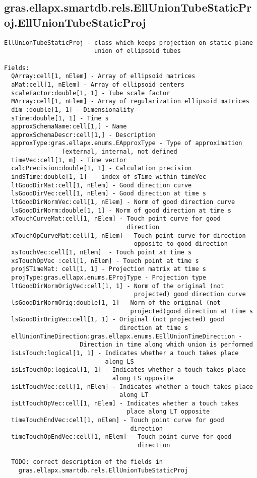 \subsection{\texorpdfstring{gras.ellapx.smartdb.rels.EllUnionTubeStaticProj.EllUnionTubeStaticProj}{EllUnionTubeStaticProj}}\label{method:gras.ellapx.smartdb.rels.EllUnionTubeStaticProj.EllUnionTubeStaticProj}
\begin{verbatim}
EllUnionTubeStaticProj - class which keeps projection on static plane
                         union of ellipsoid tubes

Fields:
  QArray:cell[1, nElem] - Array of ellipsoid matrices
  aMat:cell[1, nElem] - Array of ellipsoid centers
  scaleFactor:double[1, 1] - Tube scale factor
  MArray:cell[1, nElem] - Array of regularization ellipsoid matrices
  dim :double[1, 1] - Dimensionality
  sTime:double[1, 1] - Time s
  approxSchemaName:cell[1,] - Name
  approxSchemaDescr:cell[1,] - Description
  approxType:gras.ellapx.enums.EApproxType - Type of approximation
                (external, internal, not defined
  timeVec:cell[1, m] - Time vector
  calcPrecision:double[1, 1] - Calculation precision
  indSTime:double[1, 1]  - index of sTime within timeVec
  ltGoodDirMat:cell[1, nElem] - Good direction curve
  lsGoodDirVec:cell[1, nElem] - Good direction at time s
  ltGoodDirNormVec:cell[1, nElem] - Norm of good direction curve
  lsGoodDirNorm:double[1, 1] - Norm of good direction at time s
  xTouchCurveMat:cell[1, nElem] - Touch point curve for good
                                  direction
  xTouchOpCurveMat:cell[1, nElem] - Touch point curve for direction
                                    opposite to good direction
  xsTouchVec:cell[1, nElem]  - Touch point at time s
  xsTouchOpVec :cell[1, nElem] - Touch point at time s
  projSTimeMat: cell[1, 1] - Projection matrix at time s
  projType:gras.ellapx.enums.EProjType - Projection type
  ltGoodDirNormOrigVec:cell[1, 1] - Norm of the original (not
                                    projected) good direction curve
  lsGoodDirNormOrig:double[1, 1] - Norm of the original (not
                                   projected)good direction at time s
  lsGoodDirOrigVec:cell[1, 1] - Original (not projected) good
                                direction at time s
  ellUnionTimeDirection:gras.ellapx.enums.EEllUnionTimeDirection -
                     Direction in time along which union is performed
  isLsTouch:logical[1, 1] - Indicates whether a touch takes place
                            along LS
  isLsTouchOp:logical[1, 1] - Indicates whether a touch takes place
                              along LS opposite
  isLtTouchVec:cell[1, nElem] - Indicates whether a touch takes place
                                along LT
  isLtTouchOpVec:cell[1, nElem] - Indicates whether a touch takes
                                  place along LT opposite
  timeTouchEndVec:cell[1, nElem] - Touch point curve for good
                                   direction
  timeTouchOpEndVec:cell[1, nElem] - Touch point curve for good
                                     direction

  TODO: correct description of the fields in
    gras.ellapx.smartdb.rels.EllUnionTubeStaticProj
\end{verbatim}


